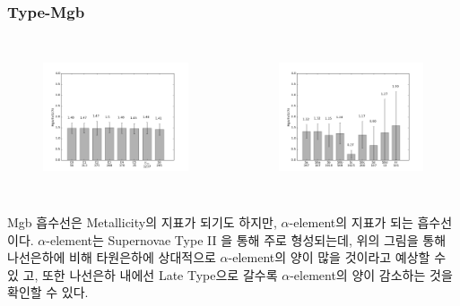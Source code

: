 \documentclass[xcolor={dvipsnames,table}]{beamer}
\newcommand\SSM{\fontsize{7}{7.2}\selectfont}
\begin{document}
\begin{frame}
 \frametitle{Type-Mgb}
 \SSM
  \begin{columns}[t]
   \begin{figure}
    \centering
    \includegraphics[width=6cm, height=4cm]{elmg2.png}
   \end{figure}
   \begin{figure}
    \centering
    \includegraphics[width=6cm, height=4cm]{spmg2.png}
   \end{figure}
  \end{columns}
\vspace{0.2cm}
Mgb 흡수선은 Metallicity의 지표가 되기도 하지만, $\alpha$-element의 지표가 되는 흡수선이다. $\alpha$-element는 Supernovae Type II
을 통해 주로 형성되는데, 위의 그림을 통해 나선은하에 비해 타원은하에 상대적으로 $\alpha$-element의 양이 많을 것이라고 예상할 수 있
고, 또한 나선은하 내에선 Late Type으로 갈수록 $\alpha$-element의 양이 감소하는 것을 확인할 수 있다.
\end{frame}
\end{document}
